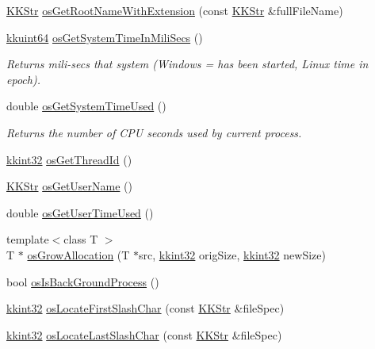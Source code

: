 \begin{DoxyCompactItemize}
\hyperlink{class_k_k_b_1_1_k_k_str}{K\+K\+Str} \hyperlink{namespace_k_k_b_a04d728a8cb494d051660f5da81bd344e}{os\+Get\+Root\+Name\+With\+Extension} (const \hyperlink{class_k_k_b_1_1_k_k_str}{K\+K\+Str} \&full\+File\+Name)
\item 
\hyperlink{namespace_k_k_b_a1f2b0568d3b63cc7697dcff73250113e}{kkuint64} \hyperlink{namespace_k_k_b_a223c5b7dc838df8f1f9801911ad1c0e1}{os\+Get\+System\+Time\+In\+Mili\+Secs} ()
\begin{DoxyCompactList}\small\item\em Returns mili-\/secs that system (Windows = has been started, Linux time in epoch). \end{DoxyCompactList}\item 
double \hyperlink{namespace_k_k_b_ac4f313e9dd666221b0fd014797decfe0}{os\+Get\+System\+Time\+Used} ()
\begin{DoxyCompactList}\small\item\em Returns the number of C\+PU seconds used by current process. \end{DoxyCompactList}\item 
\hyperlink{namespace_k_k_b_a8fa4952cc84fda1de4bec1fbdd8d5b1b}{kkint32} \hyperlink{namespace_k_k_b_aa1d581b15163a41037c43bdbd800d0f8}{os\+Get\+Thread\+Id} ()
\item 
\hyperlink{class_k_k_b_1_1_k_k_str}{K\+K\+Str} \hyperlink{namespace_k_k_b_ae91171f6d101dd1ef91138d1394b3d80}{os\+Get\+User\+Name} ()
\item 
double \hyperlink{namespace_k_k_b_ac154c2263430613c33ef577541ad33d3}{os\+Get\+User\+Time\+Used} ()
\item 
{\footnotesize template$<$class T $>$ }\\T $\ast$ \hyperlink{namespace_k_k_b_ac5c3bff96ace5c7b74168856007c23fd}{os\+Grow\+Allocation} (T $\ast$src, \hyperlink{namespace_k_k_b_a8fa4952cc84fda1de4bec1fbdd8d5b1b}{kkint32} orig\+Size, \hyperlink{namespace_k_k_b_a8fa4952cc84fda1de4bec1fbdd8d5b1b}{kkint32} new\+Size)
\item 
bool \hyperlink{namespace_k_k_b_ad7a77701df638951d935a8a96998e910}{os\+Is\+Back\+Ground\+Process} ()
\item 
\hyperlink{namespace_k_k_b_a8fa4952cc84fda1de4bec1fbdd8d5b1b}{kkint32} \hyperlink{namespace_k_k_b_a1bb498070dc63b6e0097c1a4deb49136}{os\+Locate\+First\+Slash\+Char} (const \hyperlink{class_k_k_b_1_1_k_k_str}{K\+K\+Str} \&file\+Spec)
\item 
\hyperlink{namespace_k_k_b_a8fa4952cc84fda1de4bec1fbdd8d5b1b}{kkint32} \hyperlink{namespace_k_k_b_ada3fe25ed5e0c30732f3cd6bd2a29edb}{os\+Locate\+Last\+Slash\+Char} (const \hyperlink{class_k_k_b_1_1_k_k_str}{K\+K\+Str} \&file\+Spec)

\end{DoxyCompactItemize}
